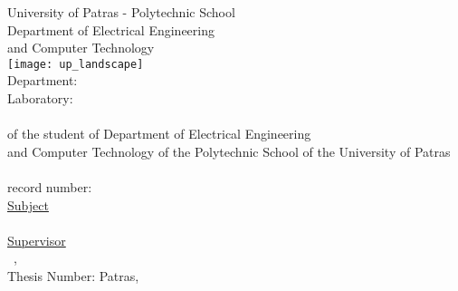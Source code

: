 \begin{titlepage}
\begin{center}
{\large University of Patras - Polytechnic School}\\
\large Department of Electrical Engineering\\and Computer Technology\\
\hfill \break
\texttt{[image: up\_landscape]}\\
\hfill \break
{\Large Department: \division \\
Laboratory: \lab }\\[1cm]

{\uline{\LARGE{\shortdoctitle }}}\\ [0.5cm]
of the student of Department of Electrical Engineering\\
and Computer Technology of the Polytechnic School of the University of Patras\\[1cm]

{\LARGE \me }\\[0.5cm]
{\Large record number: \studnum}\\[1cm]

\uline{\large Subject}\\[0.5cm]
\textbf{\large \doctitle }\\[1cm]
\uline{\large Supervisor}\\[0.5cm]
\large \suptitle \, \supname, \supuni \\[1cm]
\large{Thesis Number: }\hspace{3cm}
\vfill
\large{Patras, \monthyear}
\end{center}
\end{titlepage}
